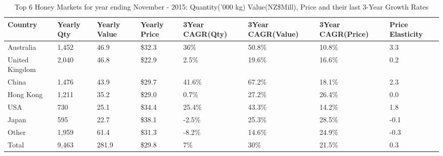 \begin{table}[ht]
\centering
{\scriptsize
\begin{tabular}[t]{p{1.8cm}>{\hfill}p{1.4cm}>{\hfill}p{1.4cm}>{\hfill}p{1.6cm}>{\hfill}p{1.9cm}>{\hfill}p{2cm}>{\hfill}p{1.9cm}>{\hfill}p{1.5cm}}
 \textbf{Country} & \textbf{Yearly Qty} & \textbf{Yearly Value} & \textbf{Yearly Price} & \textbf{3Year CAGR(Qty)} & \textbf{3Year CAGR(Value)} & \textbf{3Year CAGR(Price)} & \textbf{Price Elasticity} \\
\hline
Australia & 1,452 & 46.9 & \$32.3 & 36\% & 50.8\% & 10.8\% & 3.3 \\  
United Kingdom & 2,040 & 46.8 & \$22.9 & 2.5\% & 19.6\% & 16.6\% & 0.2 \\  
China & 1,476 & 43.9 & \$29.7 & 41.6\% & 67.2\% & 18.1\% & 2.3 \\  
Hong Kong & 1,211 & 35.2 & \$29.0 & 0.7\% & 27.2\% & 26.4\% & 0.0 \\  
USA & 730 & 25.1 & \$34.4 & 25.4\% & 43.3\% & 14.2\% & 1.8 \\  
Japan & 595 & 22.7 & \$38.1 & -2.5\% & 25.3\% & 28.5\% & -0.1 \\  
Other & 1,959 & 61.4 & \$31.3 & -8.2\% & 14.6\% & 24.9\% & -0.3 \\  
Total & 9,463 & 281.9 & \$29.8 & 7\% & 30\% & 21.5\% & 0.3 \\  
\hline
\end{tabular}
}
\caption{\scriptsize Top 6 Honey Markets for year ending November - 2015: Quantity('000 kg) Value(NZ\$Mill), Price and their last 3-Year Growth Rates}
\end{table}

